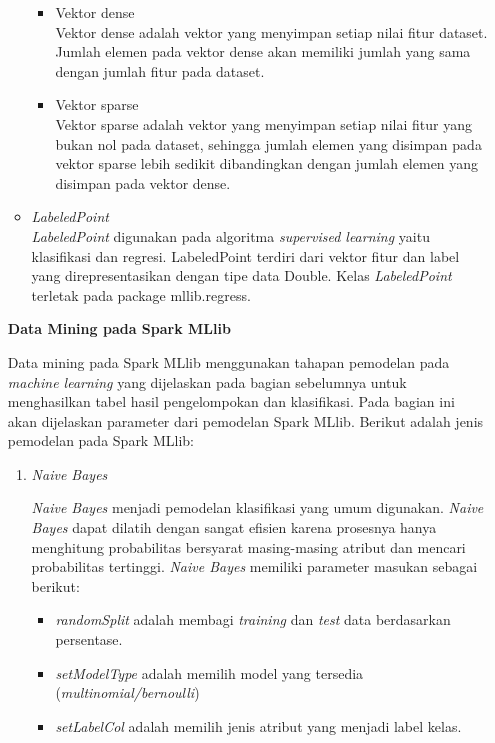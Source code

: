 \documentclass[a4paper,twoside]{article}
\begin{document}
\begin{enumerate}
\begin{itemize}
\begin{itemize}

\item Vektor dense\\
Vektor dense adalah vektor yang menyimpan setiap nilai fitur dataset. Jumlah elemen pada vektor dense akan memiliki jumlah yang sama dengan jumlah fitur pada dataset. 

\item Vektor sparse\\
Vektor sparse adalah vektor yang menyimpan setiap nilai fitur yang bukan nol pada dataset, sehingga jumlah elemen yang disimpan pada vektor sparse lebih sedikit dibandingkan dengan jumlah elemen yang disimpan pada vektor dense. 

\end{itemize}

\item \textit{LabeledPoint}\\
\textit{LabeledPoint} digunakan pada algoritma \textit{supervised learning} yaitu klasifikasi dan regresi. LabeledPoint terdiri dari vektor fitur dan label yang direpresentasikan dengan tipe data Double. Kelas \textit{LabeledPoint} terletak pada package mllib.regress.

\end{itemize}

\textbf{Data Mining pada Spark MLlib}

Data mining pada Spark MLlib menggunakan tahapan pemodelan pada \textit{machine learning} yang dijelaskan pada bagian sebelumnya untuk menghasilkan tabel hasil pengelompokan dan klasifikasi. Pada bagian ini akan dijelaskan parameter dari pemodelan Spark MLlib. Berikut adalah jenis pemodelan pada Spark MLlib:

\begin{enumerate}

\item \textit{Naive Bayes}

\textit{Naive Bayes} menjadi pemodelan klasifikasi yang umum digunakan. \textit{Naive Bayes} dapat dilatih dengan sangat efisien karena prosesnya hanya menghitung probabilitas bersyarat masing-masing atribut dan mencari probabilitas tertinggi. \textit{Naive Bayes} memiliki parameter masukan sebagai berikut:
 
\begin{itemize}
\item \textit{randomSplit} adalah membagi \textit{training} dan \textit{test} data berdasarkan persentase.
\item \textit{setModelType} adalah memilih model yang tersedia (\textit{multinomial/bernoulli})
\item \textit{setLabelCol} adalah memilih jenis atribut yang menjadi label kelas.
\end{itemize}


\end{enumerate}
\end{enumerate}
\end{document}
